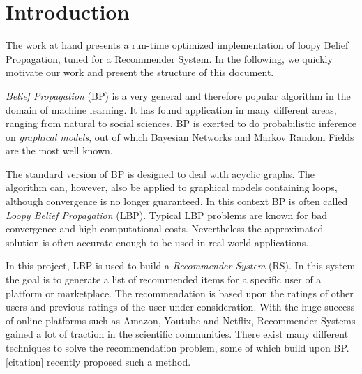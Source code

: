 
\section{Introduction}\label{sec:intro}
The work at hand presents a run-time optimized implementation of loopy Belief Propagation, tuned for a Recommender System. In the following, we quickly motivate our work and present the structure of this document.




\textit{Belief Propagation} (BP) is a very general and therefore popular algorithm in the domain of machine learning. It has found application in many different areas, ranging from natural to social sciences. 
BP is exerted to do probabilistic inference on \textit{graphical models}, out of which Bayesian Networks and Markov Random Fields are the most well known.

The standard version of BP is designed to deal with acyclic graphs. The algorithm can, however, also be applied to graphical models containing loops, although convergence is no longer guaranteed. In this context BP is often called \textit{Loopy Belief Propagation} (LBP). Typical LBP problems are known for bad convergence and high computational costs. Nevertheless the approximated solution is often accurate enough to be used in real world applications.

In this project, LBP is used to build a \textit{Recommender System} (RS). In this system the goal is to generate a list of recommended items for a specific user of a platform or marketplace. The recommendation is based upon the ratings of other users and previous ratings of the user under consideration. With the huge success of online platforms such as Amazon, Youtube and Netflix, Recommender Systems gained a lot of traction in the scientific communities. There exist many different techniques to solve the recommendation problem, some of which build upon BP. [citation] recently proposed such a method. 

